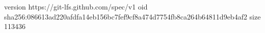 version https://git-lfs.github.com/spec/v1
oid sha256:086613ad220afdfa14eb156bc7fef9cf8a474d7754fb8ca264b64811d9eb4af2
size 113436
